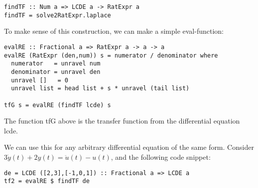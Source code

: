 \begin{verbatim}
findTF :: Num a => LCDE a -> RatExpr a
findTF = solve2RatExpr.laplace
\end{verbatim}

To make sense of this construction, we can make a simple eval-function:

\begin{verbatim}
evalRE :: Fractional a => RatExpr a -> a -> a
evalRE (RatExpr (den,num)) s = numerator / denominator where
  numerator   = unravel num
  denominator = unravel den
  unravel []   = 0
  unravel list = head list + s * unravel (tail list)

tfG s = evalRE (findTF lcde) s
\end{verbatim}

The function tfG above is the transfer function from the differential equation lcde.

We can use this for any arbitrary differential equation of the same form. Consider $3\dot{y}(t)+2y(t)=\ddot{u}(t)-u(t)$, and the following code snippet:

\begin{verbatim}
de = LCDE ([2,3],[-1,0,1]) :: Fractional a => LCDE a
tf2 = evalRE $ findTF de
\end{verbatim}



\LNReset